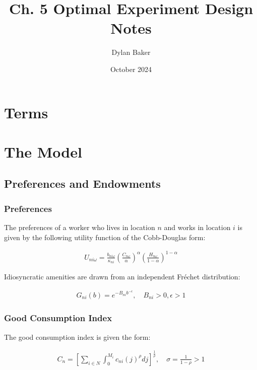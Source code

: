 \documentclass[10pt]{article}
\title{Ch. 5 Optimal Experiment Design Notes}
\author{Dylan Baker}
\date{October 2024}
\begin{document}
\maketitle

\section{Terms}



\section{The Model}

\subsection{Preferences and Endowments}

\subsubsection{Preferences}

The preferences of a worker who lives in
location $n$ and works in location $i$ 
is given by the following utility function
of the Cobb-Douglas form:

\begin{align}
    U_{n i \omega}=\frac{b_{n i \omega}}{\kappa_{n i}}\left(\frac{C_{n \omega}}{\alpha}\right)^\alpha\left(\frac{H_{n \omega}}{1-\alpha}\right)^{1-\alpha}
\end{align}

Idiosyncratic amenities 
are drawn from 
an independent Fréchet distribution:

\begin{align}
    G_{n i}(b)=e^{-B_{n i} b^{-\epsilon}}, \quad B_{n i}>0, \epsilon>1
\end{align}

\subsubsection{Good Consumption Index}

The good consumption index is given the form:

\begin{align}
    C_n=\left[\sum_{i \in N} \int_0^{M_i} c_{n i}(j)^\rho d j\right]^{\frac{1}{\rho}}, \quad \sigma=\frac{1}{1-\rho}>1
\end{align}
\end{document}
